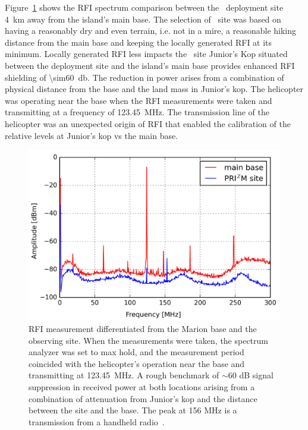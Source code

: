 Figure~\ref{fig:rfi} shows the RFI spectrum comparison between the \prizm\ deployment site \SI{4}{\kilo\metre} away from the island's main base. The selection of \prizm\ site was based on having a reasonably dry and even terrain, i.e. not in a mire, a reasonable hiking distance from the main base and keeping the locally generated RFI at its minimum. Locally generated RFI less impacts the \prizm\ site Junior's Kop situated between the deployment site and the island's main base provides enhanced RFI shielding of \SI{\sim60}{\decibel}. The reduction in power arises from a combination of physical distance from the base and the land mass in Junior's kop. The helicopter was operating near the base when the RFI measurements were taken and transmitting at a frequency of \SI{123.45}{\mega\hertz}. The transmission line of the helicopter was an unexpected origin of RFI that enabled the calibration of the relative levels at Junior's kop vs the main base.

\begin{figure}
	\centering
	\includegraphics[width=\linewidth]{Figures/rfi}
	\caption{RFI measurement differentiated from the Marion base and the \prizm observing site. When the measurements were taken, the spectrum analyzer was set to max hold, and the measurement period coincided with the helicopter's operation near the base and transmitting at \SI{123.45}{\mega\hertz}. A rough benchmark of $\sim$60 dB signal suppression in received power at both locations arising from a combination of attenuation from Junior's kop and the distance between the \prizm site and the base. The peak at 156 MHz is a transmission from a handheld radio~\citep{2019JAI.....850004P}.}
	\label{fig:rfi}
\end{figure}

